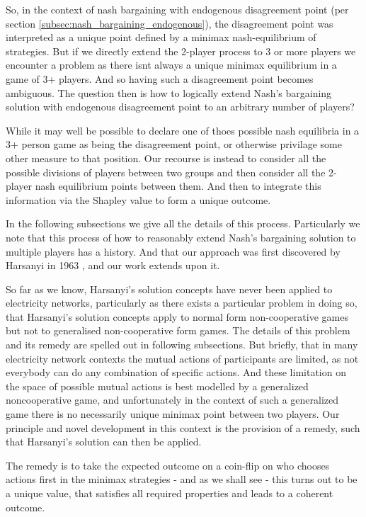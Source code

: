 So, in the context of nash bargaining with endogenous disagreement point (per section \ref{subsec:nash_bargaining_endogenous}), the disagreement point was interpreted as a unique point defined by a minimax nash-equilibrium of strategies.
But if we directly extend the 2-player process to 3 or more players we encounter a problem as there isnt always a unique minimax equilibrium in a game of 3+ players.
And so having such a disagreement point becomes ambiguous.
The question then is how to logically extend Nash's bargaining solution with endogenous disagreement point to an arbitrary number of players?

While it may well be possible to declare one of thoes possible nash equilibria in a 3+ person game as being the disagreement point, or otherwise privilage some other measure to that position.
Our recourse is instead to consider all the possible divisions of players between two groups and then consider all the 2-player nash equilibrium points between them. And then to integrate this information via the Shapley value to form a unique outcome.

In the following subsections we give all the details of this process. Particularly we note that this process of how to reasonably extend Nash's bargaining solution to multiple players has a history.
And that our approach was first discovered by Harsanyi in 1963 \cite{values3}, and our work extends upon it.

So far as we know, Harsanyi's solution concepts have never been applied to electricity networks, particularly as there exists a particular problem in doing so, that Harsanyi's solution concepts apply to normal form non-cooperative games but not to generalised non-cooperative form games.
The details of this problem and its remedy are spelled out in following subsections.
But briefly, that in many electricity network contexts the mutual actions of participants are limited, as not everybody can do any combination of specific actions.
And these limitation on the space of possible mutual actions is best modelled by a generalized noncooperative game, and unfortunately in the context of such a generalized game there is no necessarily unique minimax point between two players.
Our principle and novel development in this context is the provision of a remedy, such that Harsanyi's solution can then be applied.

The remedy is to take the expected outcome on a coin-flip on who chooses actions first in the minimax strategies - and as we shall see - this turns out to be a unique value, that satisfies all required properties and leads to a coherent outcome.

